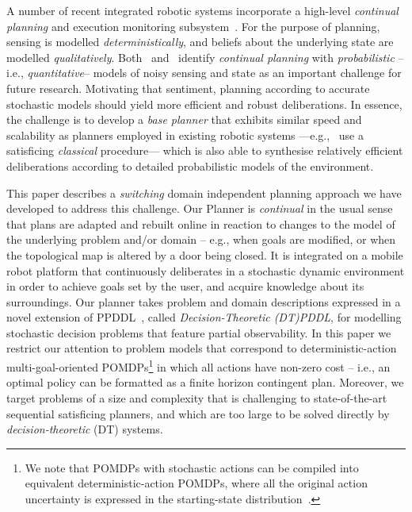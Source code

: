 



A number of recent integrated robotic systems incorporate a
high-level {\em continual planning} and execution monitoring
subsystem~\cite{wyattetal2010tamd,talamadupula:2010,Kraft2008}.
For the purpose of planning, sensing is modelled {\em
deterministically}, and beliefs about the underlying state are
modelled {\em qualitatively}.
Both~\citeauthor{talamadupula:2010} and~\citeauthor{wyattetal2010tamd}
identify
\emph{continual planning} with {\em probabilistic} --i.e., {\em quantitative}--
models of noisy sensing and state as an important challenge for future
research.
Motivating that sentiment, planning according to accurate
stochastic models should yield more efficient and robust
deliberations.
In essence, the challenge is to develop a {\em base planner} that
exhibits similar speed and scalability as planners employed in
existing robotic systems ---e.g.,~\citeauthor{wyattetal2010tamd} use a
satisficing {\em classical} procedure--- which is also able to
synthesise relatively efficient deliberations according to detailed
probabilistic models of the environment.


This paper describes a {\em switching} domain independent planning
approach we have developed to address this challenge. 
Our Planner is {\em continual} in the usual sense that plans are
adapted and rebuilt online in reaction to changes to the model of the
underlying problem and/or domain -- e.g., when goals are
modified, or when the topological map is altered by a door being
closed.
It is integrated on a mobile robot platform that continuously
deliberates in a stochastic dynamic environment in order to achieve
goals set by the user, and acquire knowledge about its surroundings.
Our planner takes problem and domain descriptions expressed in a novel
extension of PPDDL~\cite{younes:etal:2005}, called {\em
Decision-Theoretic (DT)PDDL}, for modelling stochastic decision
problems that feature partial observability.  In this paper we
restrict our attention to problem models that correspond to
deterministic-action multi-goal-oriented POMDPs\footnote{We note that
POMDPs with stochastic actions can be compiled into equivalent
deterministic-action POMDPs, where all the original action uncertainty
is expressed in the starting-state
distribution~\cite{ng:Jordan:2000}.} in which all actions have
non-zero cost -- i.e., an optimal policy can be formatted as a finite
horizon contingent plan. Moreover, we target problems of a size and
complexity that is challenging to state-of-the-art sequential
satisficing planners, and which are too large to be solved directly by
{\em decision-theoretic} (DT) systems.

